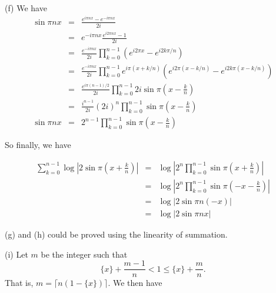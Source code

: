 \documentclass[a4paper,12pt]{article}
\newcommand{\subpar}[1]{\medskip \noindent (#1)}
\begin{document}
\subpar{f} We have
\begin{eqnarray*}
  \sin \pi n x &=& \frac{e^{i\pi nx} - e^{-i\pi nx}}{2i} \\
  &=& e^{-i\pi nx} \frac{e^{i2\pi nx} - 1}{2i} \\
  &=& \frac{e^{-i\pi nx}}{2i} \prod_{k=0}^{n-1}(e^{i2\pi x} -
  e^{i2k\pi/n}) \\
  &=& \frac{e^{-i\pi nx}}{2i}
  \prod_{k=0}^{n-1}e^{i\pi(x+k/n)}(e^{i2\pi (x-k/n)} -
  e^{i2k\pi(x-k/n)}) \\
  &=& \frac{e^{i\pi(n-1)/2}}{2i} \prod_{k=0}^{n-1} 2i \sin\pi\left(x
  - \frac{k}{n}\right) \\
  &=& \frac{i^{n-1}}{2i} (2i)^n \prod_{k=0}^{n-1} \sin\pi\left(x
  - \frac{k}{n}\right) \\
  \sin \pi n x &=& 2^{n-1} \prod_{k=0}^{n-1} \sin\pi\left(x
  - \frac{k}{n}\right)
\end{eqnarray*}

So finally, we have

\begin{eqnarray*}
  \sum_{k=0}^{n-1} \log\left|2 \sin\pi \left(x +
  \frac{k}{n}\right)\right| &=& \log \left| 2^n \prod_{k=0}^{n-1}
  \sin\pi \left(x + \frac{k}{n}\right)\right| \\
  &=& \log \left| 2^n \prod_{k=0}^{n-1} \sin\pi\left(-x -
  \frac{k}{n}\right)\right| \\
  &=& \log| 2 \sin\pi n(-x)| \\
  &=& \log| 2 \sin\pi n x|
\end{eqnarray*}

\subpar{g} and \subpar{h} could be proved using the linearity of
summation.

\subpar{i}  Let $m$ be the integer such that
\[ \{x\} + \frac{m-1}{n} < 1 \le \{x\} + \frac{m}{n}.\]
That is, $m = \lceil n(1-\{x\})\rceil$.  We then have
\end{document}
